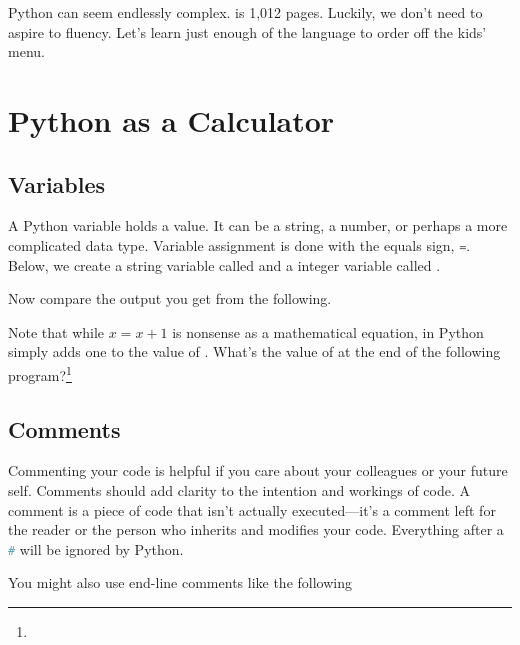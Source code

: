 \documentclass{article}
\begin{document}
Python can seem endlessly complex.  is 1,012 pages. Luckily, we don't need to aspire to fluency. Let's learn just enough of the language to order off the kids' menu. 


\section{Python as a Calculator}

\subsection{Variables}

A Python variable holds a value. It can be a string, a number, or perhaps a more complicated data type. Variable assignment is done with the equals sign, \lstinline[language = Python]{=}. Below, we create a string variable called  and a integer variable called . 

\smallskip


\smallskip
\noindent Now compare the output you get from the following.


\noindent Note that while $x = x+1$ is nonsense as a mathematical equation, in Python  simply adds one to the value of . What's the value of  at the end of the following program?\footnote{}


\subsection{Comments}
Commenting your code is helpful if you care about your colleagues or your future self. Comments should add clarity to the intention and workings of code. A comment is a piece of code that isn't actually executed---it's a comment left for the reader or the person who inherits and modifies your code.
Everything after a \lstinline[language = Python]{#} will be ignored by Python.


\smallskip
 \noindent You might also use end-line comments like the following



\smallskip
\end{document}
